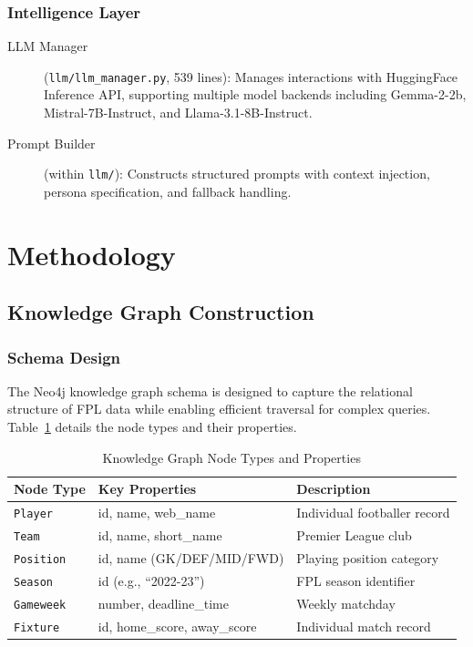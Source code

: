 \documentclass[11pt, a4paper]{article}
\begin{document}
\subsubsection{Intelligence Layer}
\begin{description}
    \item[LLM Manager] (\texttt{llm/llm\_manager.py}, 539 lines): Manages interactions with HuggingFace Inference API, supporting multiple model backends including Gemma-2-2b, Mistral-7B-Instruct, and Llama-3.1-8B-Instruct.
    
    \item[Prompt Builder] (within \texttt{llm/}): Constructs structured prompts with context injection, persona specification, and fallback handling.
\end{description}

\section{Methodology}
\label{sec:methodology}

\subsection{Knowledge Graph Construction}

\subsubsection{Schema Design}
The Neo4j knowledge graph schema is designed to capture the relational structure of FPL data while enabling efficient traversal for complex queries. Table~\ref{tab:schema} details the node types and their properties.

\begin{table}[H]
\centering
\caption{Knowledge Graph Node Types and Properties}
\label{tab:schema}
\begin{tabular}{@{}lll@{}}
\toprule
\textbf{Node Type} & \textbf{Key Properties} & \textbf{Description} \\
\midrule
\texttt{Player} & id, name, web\_name & Individual footballer record \\
\texttt{Team} & id, name, short\_name & Premier League club \\
\texttt{Position} & id, name (GK/DEF/MID/FWD) & Playing position category \\
\texttt{Season} & id (e.g., ``2022-23'') & FPL season identifier \\
\texttt{Gameweek} & number, deadline\_time & Weekly matchday \\
\texttt{Fixture} & id, home\_score, away\_score & Individual match record \\
\bottomrule
\end{tabular}
\end{table}
\end{document}
